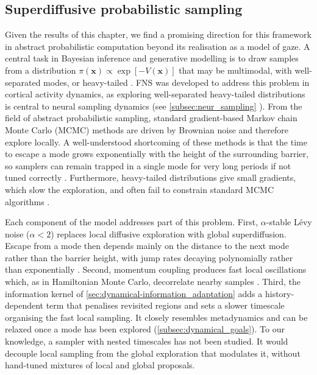 \subsection{Superdiffusive probabilistic sampling}\label{subsec:superdiffusive_probability_sampling}
Given the results of this chapter, we find a promising direction for this framework in abstract probabilistic computation beyond its realisation as a model of gaze. A central task in Bayesian inference and generative modelling is to draw samples from a distribution $\pi(\mathbf{x}) \propto \exp[-V(\mathbf{x})]$ that may be multimodal, with well-separated modes, or heavy-tailed \cite{latuszynski_mcmc_2025, betancourt_conceptual_2018}. FNS was developed to address this problem in cortical activity dynamics, as exploring well-separated heavy-tailed distributions is central to neural sampling dynamics (see \cref{subsec:neur_sampling} \cite{qi_fractional_2022}). From the field of abstract probabilistic sampling, standard gradient-based Markov chain Monte Carlo (MCMC) methods are driven by Brownian noise and therefore explore locally. A well-understood shortcoming of these methods is that the time to escape a mode grows exponentially with the height of the surrounding barrier, so samplers can remain trapped in a single mode for very long periods if not tuned correctly \cite{latuszynski_mcmc_2025}. Furthermore, heavy-tailed distributions give small gradients, which slow the exploration, and often fail to constrain standard MCMC algorithms \cite{behme_levy_2026}.

Each component of the model addresses part of this problem. First, $\alpha$-stable Lévy noise ($\alpha < 2$) replaces local diffusive exploration with global superdiffusion. Escape from a mode then depends mainly on the distance to the next mode rather than the barrier height, with jump rates decaying polynomially rather than exponentially \cite{behme_levy_2026, ijcai2018p419}. Second, momentum coupling produces fast local oscillations which, as in Hamiltonian Monte Carlo, decorrelate nearby samples \cite{ijcai2018p419, betancourt_conceptual_2018}. Third, the information kernel of \cref{sec:dynamical-information_adaptation} adds a history-dependent term that penalises revisited regions and sets a slower timescale organising the fast local sampling. It closely resembles metadynamics \cite{tiwary_time-independent_2015} and can be relaxed once a mode has been explored (\cref{subsec:dynamical_goals}). To our knowledge, a sampler with nested timescales has not been studied. It would decouple local sampling from the global exploration that modulates it, without hand-tuned mixtures of local and global proposals.

